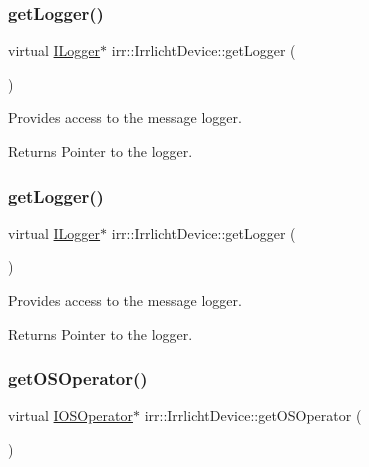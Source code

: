 \subsubsection{\texorpdfstring{get\+Logger()}{getLogger()}\hspace{0.1cm}{\footnotesize\ttfamily [1/2]}}
{\footnotesize\ttfamily virtual \hyperlink{classirr_1_1ILogger}{I\+Logger}$\ast$ irr\+::\+Irrlicht\+Device\+::get\+Logger (\begin{DoxyParamCaption}{ }\end{DoxyParamCaption})\hspace{0.3cm}{\ttfamily [pure virtual]}}



Provides access to the message logger. 

\begin{DoxyReturn}{Returns}
Pointer to the logger. 
\end{DoxyReturn}
\mbox{\label{classirr_1_1IrrlichtDevice_adec0b0b6b71b5066dd2c7039f1f4d85b}} 
\subsubsection{\texorpdfstring{get\+Logger()}{getLogger()}\hspace{0.1cm}{\footnotesize\ttfamily [2/2]}}
{\footnotesize\ttfamily virtual \hyperlink{classirr_1_1ILogger}{I\+Logger}$\ast$ irr\+::\+Irrlicht\+Device\+::get\+Logger (\begin{DoxyParamCaption}{ }\end{DoxyParamCaption})\hspace{0.3cm}{\ttfamily [pure virtual]}}



Provides access to the message logger. 

\begin{DoxyReturn}{Returns}
Pointer to the logger. 
\end{DoxyReturn}
\mbox{\label{classirr_1_1IrrlichtDevice_a3833250e8b0d7a94cd34b1e1809033ac}} 
\subsubsection{\texorpdfstring{get\+O\+S\+Operator()}{getOSOperator()}\hspace{0.1cm}{\footnotesize\ttfamily [1/2]}}
{\footnotesize\ttfamily virtual \hyperlink{classirr_1_1IOSOperator}{I\+O\+S\+Operator}$\ast$ irr\+::\+Irrlicht\+Device\+::get\+O\+S\+Operator (\begin{DoxyParamCaption}{ }\end{DoxyParamCaption})\hspace{0.3cm}{\ttfamily [pure virtual]}}



